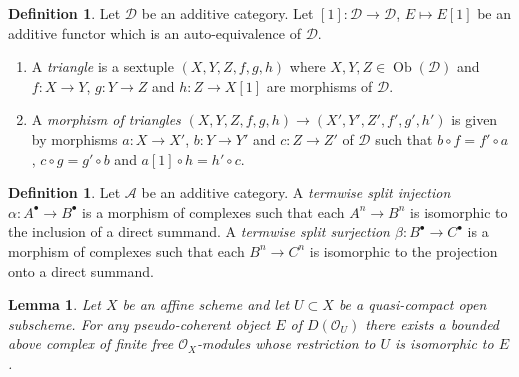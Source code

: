 \documentclass{amsart}
\theoremstyle{plain}
\newtheorem{lemma}[subsection]{Lemma}
\theoremstyle{definition}
\newtheorem{definition}[subsection]{Definition}
\theoremstyle{remark}
\numberwithin{equation}{subsection}
\def\Ob{\mathop{\mathrm{Ob}}\nolimits}
\begin{document}
\begin{definition}
\label{derived-definition-triangle}
Let $\mathcal{D}$ be an additive category. Let
$[1] : \mathcal{D} \to \mathcal{D}$, $E \mapsto E[1]$
be an additive functor which is an auto-equivalence of $\mathcal{D}$.
\begin{enumerate}
\item A {\it triangle} is a sextuple
$(X, Y, Z, f, g, h)$ where $X, Y, Z \in \Ob(\mathcal{D})$ and
$f : X \to Y$, $g : Y \to Z$ and $h : Z \to X[1]$ are morphisms
of $\mathcal{D}$.
\item A {\it morphism of triangles}
$(X, Y, Z, f, g, h) \to (X', Y', Z', f', g', h')$
is given by morphisms $a : X \to X'$, $b : Y \to Y'$ and $c : Z \to Z'$
of $\mathcal{D}$ such that
$b \circ f = f' \circ a$, $c  \circ g = g' \circ b$ and
$a[1] \circ h = h' \circ c$.
\end{enumerate}
\end{definition}

\begin{definition}
\label{derived-definition-termwise-split-map}
Let $\mathcal{A}$ be an additive category.
A {\it termwise split injection $\alpha : A^\bullet \to B^\bullet$}
is a morphism of complexes such that each $A^n \to B^n$
is isomorphic to the inclusion of a direct summand.
A {\it termwise split surjection $\beta : B^\bullet \to C^\bullet$}
is a morphism of complexes such that each $B^n \to C^n$
is isomorphic to the projection onto a direct summand.
\end{definition}

\begin{lemma}
\label{lemma-lift-pseudo-coherent}
Let $X$ be an affine scheme and let $U \subset X$ be a quasi-compact
open subscheme. For any pseudo-coherent object $E$ of $D(\mathcal{O}_U)$
there exists a bounded above complex of finite free $\mathcal{O}_X$-modules 
whose restriction to $U$ is isomorphic to $E$.
\end{lemma}
\end{document}
